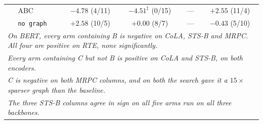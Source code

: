 \documentclass{article}
\begin{document}
\begin{table}[h]
\begin{center}
\begin{tabular}{llcccc}
 & ABC & $-4.78$ (4/11) & $-4.51^{\ddagger}$ (0/15) & --- & $+2.55$ (11/4) \\
 & \texttt{no graph} & $+2.58$ (10/5) & $+0.00$ (8/7) & --- & $-0.43$ (5/10) \\
\midrule
\multicolumn{6}{l}{\emph{On BERT, every arm containing B is negative on CoLA,
STS-B and MRPC. All four are positive on RTE, none significantly.}} \\
\multicolumn{6}{l}{\emph{Every arm containing C but not B is positive on CoLA
and STS-B, on both encoders.}} \\
\multicolumn{6}{l}{\emph{C is negative on both MRPC columns, and on both the
search gave it a $15\times$ sparser graph than the baseline.}} \\
\multicolumn{6}{l}{\emph{The three STS-B columns agree in sign on all five arms
run on all three backbones.}} \\
\bottomrule
\end{tabular}
\end{center}
\end{table}
\end{document}
